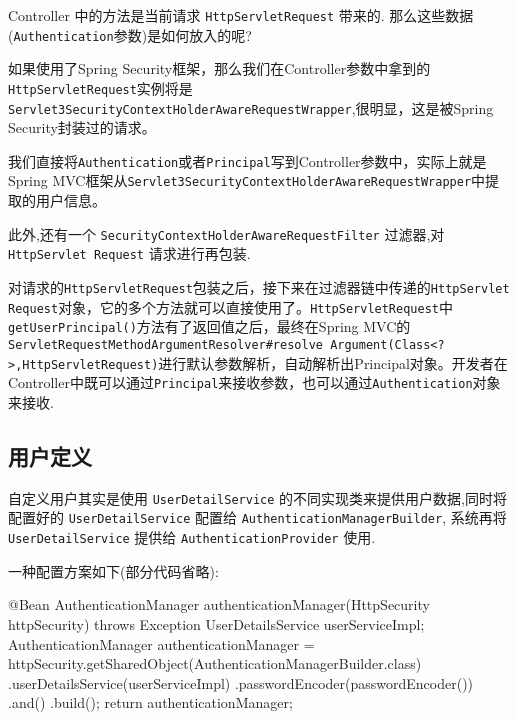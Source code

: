 Controller 中的方法是当前请求 \texttt{HttpServletRequest} 带来的. 那么这些数据(\texttt{Authentication}参数)是如何放入的呢?

如果使用了Spring Security框架，那么我们在Controller参数中拿到的\texttt{HttpServletRequest}实例将是\texttt{Servlet3SecurityContextHolderAwareRequestWrapper},很明显，这是被Spring Security封装过的请求。

我们直接将\texttt{Authentication}或者\texttt{Principal}写到Controller参数中，实际上就是Spring MVC框架从\texttt{Servlet3SecurityContextHolderAwareRequestWrapper}中提取的用户信息。

此外,还有一个 \texttt{SecurityContextHolderAwareRequestFilter} 过滤器,对 \texttt{HttpServlet Request} 请求进行再包装. 

对请求的\texttt{HttpServletRequest}包装之后，接下来在过滤器链中传递的\texttt{HttpServlet Request}对象，它的多个方法就可以直接使用了。\texttt{HttpServletRequest}中\texttt{getUserPrincipal()}方法有了返回值之后，最终在Spring MVC的\texttt{ServletRequestMethodArgumentResolver\#resolve Argument(Class<?>,HttpServletRequest)}进行默认参数解析，自动解析出Principal对象。开发者在Controller中既可以通过\texttt{Principal}来接收参数，也可以通过\texttt{Authentication}对象来接收.

\subsection{用户定义}

自定义用户其实是使用 \texttt{UserDetailService} 的不同实现类来提供用户数据,同时将配置好的 \texttt{UserDetailService} 配置给 \texttt{AuthenticationManagerBuilder}, 系统再将 \texttt{UserDetailService} 提供给 \texttt{AuthenticationProvider} 使用.

一种配置方案如下(部分代码省略):

\begin{Java}
@Bean
AuthenticationManager authenticationManager(HttpSecurity httpSecurity) throws Exception {
    UserDetailsService userServiceImpl;
    AuthenticationManager authenticationManager = httpSecurity.getSharedObject(AuthenticationManagerBuilder.class)
            .userDetailsService(userServiceImpl)
            .passwordEncoder(passwordEncoder())
            .and()
            .build();
    return authenticationManager;
}
\end{Java}

\newpage